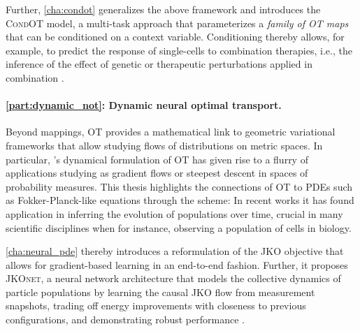 Further, \cref{cha:condot} generalizes the above framework and introduces the \textsc{CondOT} model, a multi-task approach that parameterizes a \emph{family of OT maps} that can be conditioned on a context variable. Conditioning thereby allows, for example, to predict the response of single-cells to combination therapies, i.e., the inference of the effect of genetic or therapeutic perturbations applied in combination \citep{bunne2022supervised}. \\
	


\paragraph{\cref{part:dynamic_not}: Dynamic neural optimal transport.}

Beyond mappings, OT provides a mathematical link to geometric variational frameworks that allow studying flows of distributions on metric spaces.
In particular, \citeauthor{brenier1987decomposition}'s dynamical formulation of OT has given rise to a flurry of applications studying  as gradient flows or steepest descent in spaces of probability measures.
This thesis highlights the connections of OT to PDEs such as Fokker-Planck-like equations through the \citeauthor*{jordan1998variational} scheme: In recent works \citep{bunne2022proximal, alvarez2021optimizing, mokrov2021large, benamou2016augmented} 
it has found application in inferring the evolution of populations over time, crucial in many scientific disciplines when for instance, observing a population of cells in biology.

\cref{cha:neural_pde} thereby introduces a reformulation of the JKO objective that allows for gradient-based learning in an end-to-end fashion. Further, it proposes \textsc{JKOnet}, a neural network architecture that models the collective dynamics of particle populations by learning the causal JKO flow from measurement snapshots, trading off energy improvements with closeness to previous configurations, and demonstrating robust performance \citep{bunne2022proximal}.

